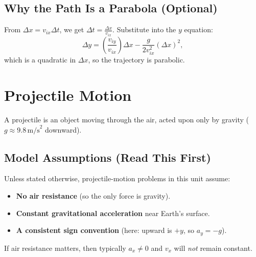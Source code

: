 \documentclass{article}
\begin{document}
\subsection{Why the Path Is a Parabola (Optional)}
From $\Delta x = v_{ix}\Delta t$, we get $\Delta t = \frac{\Delta x}{v_{ix}}$. Substitute into the $y$ equation:
\begin{equation}
  \Delta y = \left(\frac{v_{iy}}{v_{ix}}\right)\Delta x - \frac{g}{2v_{ix}^2}(\Delta x)^2,
\end{equation}
which is a quadratic in $\Delta x$, so the trajectory is parabolic.

\newpage
\section{Projectile Motion}
A projectile is an object moving through the air, acted upon only by gravity ($g \approx 9.8 \, \text{m/s}^2$ downward).

\subsection{Model Assumptions (Read This First)}
Unless stated otherwise, projectile-motion problems in this unit assume:
\begin{itemize}
  \item \textbf{No air resistance} (so the only force is gravity).
  \item \textbf{Constant gravitational acceleration} near Earth's surface.
  \item \textbf{A consistent sign convention} (here: upward is $+y$, so $a_y=-g$).
\end{itemize}
If air resistance matters, then typically $a_x \neq 0$ and $v_x$ will \emph{not} remain constant.

\begin{center}
\end{center}
\end{document}
